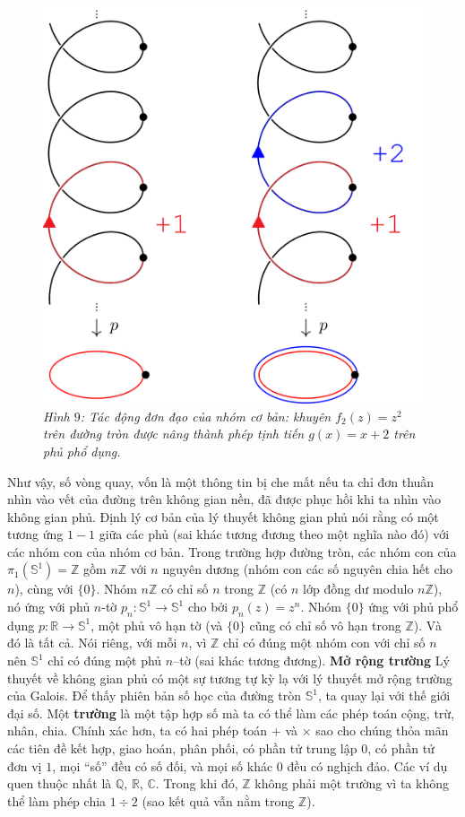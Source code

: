 \begin{multicols}{2}
\begin{figure}[H]
		\vspace*{-10pt}
		\centering
		\captionsetup{labelformat= empty, justification=centering}
		\includegraphics[width= 0.65\linewidth]{h9.png}
		\caption{\small\textit{\color{duongvaotoanhoc}Hình $9$: Tác động đơn đạo của nhóm cơ bản: khuyên $f_2(z) = z^2$ trên đường tròn được nâng thành phép tịnh tiến $g(x) = x+2$ trên phủ phổ dụng.}}
		\vspace*{-10pt}
	\end{figure}
	Như vậy, số vòng quay, vốn là một thông tin bị che mất nếu ta chỉ đơn thuần nhìn vào vết của đường trên không gian nền, đã được phục hồi khi ta nhìn vào không gian phủ.
	\vskip 0.1cm
	Định lý cơ bản của lý thuyết không gian phủ nói rằng có một tương ứng $1-1$ giữa các phủ (sai khác tương đương theo một nghĩa nào đó) với các nhóm con của nhóm cơ bản. Trong trường hợp đường tròn, các nhóm con của $\pi_1(\mathbb{S}^1) = \mathbb{Z}$ gồm $n\mathbb{Z}$ với $n$ nguyên dương (nhóm con các số nguyên chia hết cho $n$), cùng với $\{0\}$. Nhóm $n\mathbb{Z}$ có chỉ số $n$ trong $\mathbb{Z}$ (có $n$ lớp đồng dư modulo $n\mathbb{Z}$), nó ứng với phủ $n$-tờ $p_n: \mathbb{S}^1 \to \mathbb{S}^1$ cho bởi $p_n(z) = z^n$. Nhóm $\{0\}$ ứng với phủ phổ dụng $p: \mathbb{R} \to \mathbb{S}^1$, một phủ vô hạn tờ (và $\{0\}$ cũng có chỉ số vô hạn trong $\mathbb{Z}$). Và đó là tất cả. Nói riêng, với mỗi $n$, vì $\mathbb{Z}$ chỉ có đúng một nhóm con với chỉ số $n$ nên $\mathbb{S}^1$ chỉ có đúng một phủ $n$--tờ (sai khác tương đương).
	\vskip 0.1cm
	\textbf{\color{duongvaotoanhoc}Mở rộng trường}
	\vskip 0.1cm
	Lý thuyết về không gian phủ có một sự tương tự kỳ lạ với lý thuyết mở rộng trường của Galois. Để thấy phiên bản số học của đường tròn $\mathbb{S}^1$, ta quay lại với thế giới đại số. Một {\bf\color{duongvaotoanhoc} trường} là một tập hợp số mà ta có thể làm các phép toán cộng, trừ, nhân, chia. Chính xác hơn, ta có hai phép toán $+$ và $\times$ sao cho chúng thỏa mãn các tiên đề kết hợp, giao hoán, phân phối, có phần tử trung lập $0$, có phần tử đơn vị $1$, mọi ``số'' đều có số đối, và mọi số khác $0$ đều có nghịch đảo. Các ví dụ quen thuộc nhất là $\mathbb{Q}$, $\mathbb{R}$, $\mathbb{C}$. Trong khi đó, $\mathbb{Z}$ không phải một trường vì ta không thể làm phép chia $1 \div 2$ (sao kết quả vẫn nằm trong $\mathbb{Z}$).

\end{multicols}
